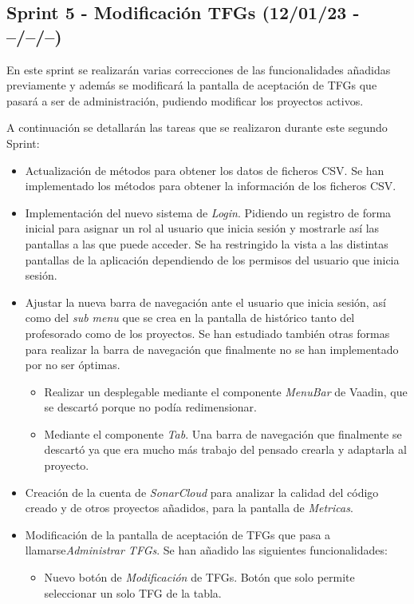 \subsection{Sprint 5 - Modificación TFGs (12/01/23 - --/--/--) }

En este sprint se realizarán varias correcciones de las funcionalidades añadidas previamente y además se modificará la pantalla de aceptación de TFGs que pasará a ser de administración, pudiendo modificar los proyectos activos.

A continuación se detallarán las tareas que se realizaron durante este segundo Sprint:

\begin{itemize}
	\item Actualización de métodos para obtener los datos de ficheros CSV. Se han implementado los métodos para obtener la información de los ficheros CSV.
	\item Implementación del nuevo sistema de \emph{Login}. Pidiendo un registro de forma inicial para asignar un rol al usuario que inicia sesión y mostrarle así las pantallas a las que puede acceder. Se ha restringido la vista a las distintas pantallas de la aplicación dependiendo de los permisos del usuario que inicia sesión.
	\item Ajustar la nueva barra de navegación ante el usuario que inicia sesión, así como del \emph{sub menu} que se crea en la pantalla de histórico tanto del profesorado como de los proyectos. Se han estudiado también otras formas para realizar la barra de navegación que finalmente no se han implementado por no ser óptimas.
	\begin{itemize}
		\item Realizar un desplegable mediante el componente \emph{MenuBar} de Vaadin, que se descartó porque no podía redimensionar.
		\item Mediante el componente \emph{Tab}. Una barra de navegación que finalmente se descartó ya que era mucho más trabajo del pensado crearla y adaptarla al proyecto.
	\end{itemize}		
	\item Creación de la cuenta de \emph{SonarCloud} para analizar la calidad del código creado y de otros proyectos añadidos, para la pantalla de \emph{Metricas}.
	\item Modificación de la pantalla de aceptación de TFGs que pasa a llamarse\emph{Administrar TFGs}. Se han añadido las siguientes funcionalidades:
	\begin{itemize}
		\item Nuevo botón de \emph{Modificación} de TFGs. Botón que solo permite seleccionar un solo TFG de la tabla.

\end{itemize}
\end{itemize}
